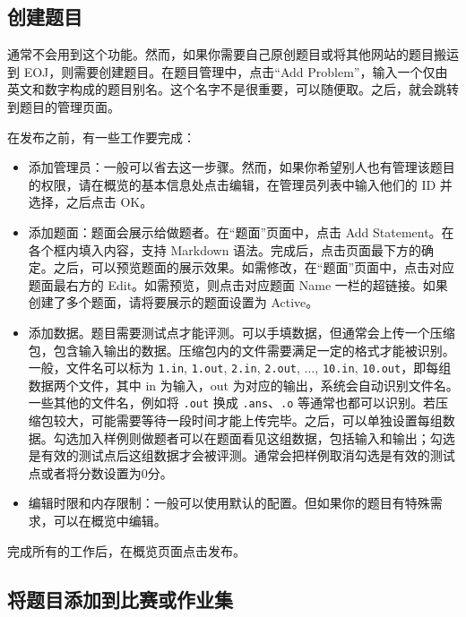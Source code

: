 \documentclass[oneside]{book}
\begin{document}
\subsection{创建题目}

\label{ssec:create_new_problem}

通常不会用到这个功能。然而，如果你需要自己原创题目或将其他网站的题目搬运到 EOJ，则需要创建题目。在题目管理中，点击``Add Problem''，输入一个仅由英文和数字构成的题目别名。这个名字不是很重要，可以随便取。之后，就会跳转到题目的管理页面。

在发布之前，有一些工作要完成：

\begin{itemize}
  \item 添加管理员：一般可以省去这一步骤。然而，如果你希望别人也有管理该题目的权限，请在概览的基本信息处点击编辑，在管理员列表中输入他们的 ID 并选择，之后点击 OK。
  \item 添加题面：题面会展示给做题者。在``题面''页面中，点击 Add Statement。在各个框内填入内容，支持 Markdown 语法。完成后，点击页面最下方的确定。之后，可以预览题面的展示效果。如需修改，在``题面''页面中，点击对应题面最右方的 Edit。如需预览，则点击对应题面 Name 一栏的超链接。如果创建了多个题面，请将要展示的题面设置为 Active。
  \item 添加数据。题目需要测试点才能评测。可以手填数据，但通常会上传一个压缩包，包含输入输出的数据。压缩包内的文件需要满足一定的格式才能被识别。一般，文件名可以标为 \lstinline|1.in|, \lstinline|1.out|, \lstinline|2.in|, \lstinline|2.out|, $\dots$, \lstinline|10.in|, \lstinline|10.out|，即每组数据两个文件，其中 in 为输入，out 为对应的输出，系统会自动识别文件名。一些其他的文件名，例如将 \lstinline|.out| 换成 \lstinline|.ans|、\lstinline|.o| 等通常也都可以识别。若压缩包较大，可能需要等待一段时间才能上传完毕。之后，可以单独设置每组数据。勾选加入样例则做题者可以在题面看见这组数据，包括输入和输出；勾选是有效的测试点后这组数据才会被评测。通常会把样例取消勾选是有效的测试点或者将分数设置为0分。
  \item 编辑时限和内存限制：一般可以使用默认的配置。但如果你的题目有特殊需求，可以在概览中编辑。
\end{itemize}

完成所有的工作后，在概览页面点击发布。

\subsection{将题目添加到比赛或作业集}

\label{ssec:add_problem_to_contest}
\end{document}
